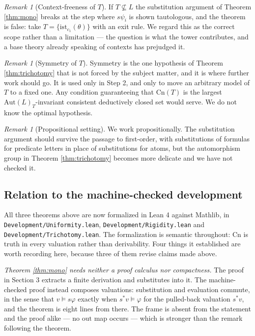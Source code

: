 \documentclass[11pt]{article}
\theoremstyle{plain}
\theoremstyle{definition}
\theoremstyle{remark}
\newtheorem{remark}[theorem]{Remark}
\newcommand{\ist}{\mathrm{ist}}
\newcommand{\Cn}{\mathrm{Cn}}
\newcommand{\Aut}{\mathrm{Aut}}
\newcommand{\out}{\mathrm{out}}
\begin{document}
\begin{remark}[Context-freeness of $T$]\label{rem:contextfree}
If $T \not\subseteq L$ the substitution argument of Theorem \ref{thm:mono}
breaks at the step where $s\psi_i$ is shown tautologous, and the theorem is
false: take $T = \{\ist_{c_1}(\theta)\}$ with an exit rule. We regard this as
the correct scope rather than a limitation --- the question is what the tower
contributes, and a base theory already speaking of contexts has prejudged it.
\end{remark}

\begin{remark}[Symmetry of $T$]
Symmetry is the one hypothesis of Theorem \ref{thm:trichotomy} that is not
forced by the subject matter, and it is where further work should go. It is used
only in Step 2, and only to move an arbitrary model of $T$ to a fixed one. Any
condition guaranteeing that $\Cn(T)$ is the largest $\Aut(L)_T$-invariant
consistent deductively closed set would serve. We do not know the optimal
hypothesis.
\end{remark}

\begin{remark}[Propositional setting]
We work propositionally. The substitution argument should survive the passage to
first-order, with substitutions of formulas for predicate letters in place of
substitutions for atoms, but the automorphism group in
Theorem \ref{thm:trichotomy} becomes more delicate and we have not checked it.
\end{remark}

\subsection{Relation to the machine-checked development}\label{sec:formal}

All three theorems above are now formalized in Lean 4 against Mathlib, in
\texttt{Development/\allowbreak Uniformity.lean},
\texttt{Development/\allowbreak Rigidity.lean} and
\texttt{Development/\allowbreak Trichotomy.lean}. The formalization is semantic throughout:
$\Cn$ is truth in every valuation rather than derivability. Four things it
established are worth recording here, because three of them revise claims made
above.

\emph{Theorem \ref{thm:mono} needs neither a proof calculus nor compactness.}
The proof in Section 3 extracts a finite derivation and substitutes into it. The
machine-checked proof instead composes valuations: substitution and evaluation
commute, in the sense that $v \models s\varphi$ exactly when $s^{*}v \models
\varphi$ for the pulled-back valuation $s^{*}v$, and the theorem is eight lines
from there. The frame is absent from the statement and the proof alike --- no
$\out$ map occurs --- which is stronger than the remark following the theorem.
\end{document}
